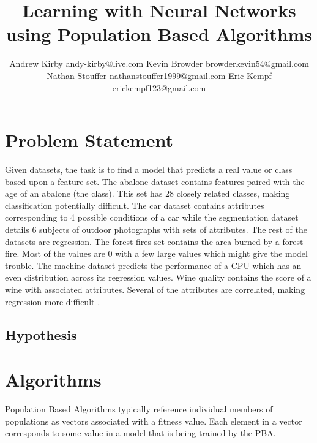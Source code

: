 \documentclass[twoside,10pt]{article}
\begin{document}
\title{Learning with Neural Networks using Population Based Algorithms}

\author{\name Andrew Kirby \email andy-kirby@live.com \AND
		\name Kevin Browder \email browderkevin54@gmail.com \AND
		\name Nathan Stouffer \email nathanstouffer1999@gmail.com \AND
		\name Eric Kempf \email erickempf123@gmail.com }

\maketitle

\begin{abstract}

\end{abstract}


\section{Problem Statement}
	Given datasets, the task is to find a model that predicts a real value or class based upon a feature set. The abalone dataset contains features paired with the age of an abalone (the class). This set has 28 closely related classes, making classification potentially difficult.
	The car dataset contains attributes corresponding to 4 possible conditions of a car while the segmentation dataset details 6 subjects of outdoor photographs with sets of attributes.
	The rest of the datasets are regression.
	The forest fires set contains the area burned by a forest fire. Most of the values are 0 with a few large values which might give the model trouble.
	The machine dataset predicts the performance of a CPU which has an even distribution across its regression values. Wine quality contains the score of a wine with associated attributes. Several of the attributes are correlated, making regression more difficult \citep{datasets}.

\subsection{Hypothesis}

\section{Algorithms}

	Population Based Algorithms typically reference individual members of populations as vectors associated with a fitness value. Each element in a vector corresponds to some value in a model that is being trained by the PBA.
	
\end{document}
